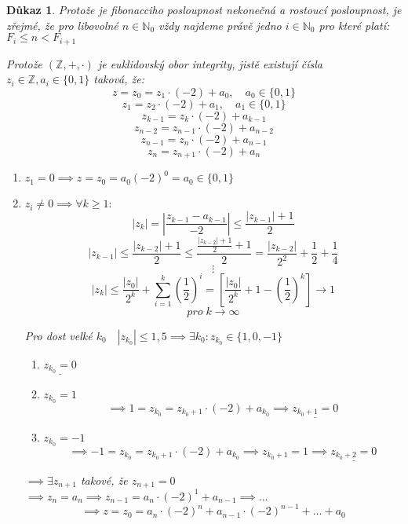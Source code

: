 \documentclass[12pt]{book}
\newtheorem*{dukaz}{Důkaz}
\begin{document}
\begin{dukaz}\label{fiboDF}
	Protože je fibonacciho posloupnost nekonečná a rostoucí posloupnost, je zřejmé, že pro libovolné $n\in\mathbb{N}_0$ vždy najdeme právě jedno $i\in\mathbb{N}_0$ pro které platí: $F_i\le n<F_{i+1}$
	
	Protože $(\mathbb{Z},+,\cdot)$ je euklidovský obor integrity, jistě existují čísla $z_i\in\mathbb{Z}, a_i\in\{0,1\}$ taková, že:
	$$ z=z_0=z_1\cdot(-2)+a_0,\quad a_0\in\{0,1\}$$
	$$ z_1=z_2\cdot(-2)+a_1,\quad a_1\in\{0,1\}$$
	$$ z_{k-1}=z_k\cdot(-2)+a_{k-1}$$
	$$ z_{n-2}=z_{n-1}\cdot(-2)+a_{n-2}$$
	$$ z_{n-1}=z_n\cdot(-2)+a_{n-1}$$
	$$ z_n=z_{n+1}\cdot(-2)+a_n$$
	\begin{enumerate}
		\item[$\alpha)$] $z_1=0 \implies z=z_0=a_0(-2)^0=a_0\in\{0,1\}$
		\item[$\beta)$]  $z_i \ne 0 \implies \forall k \ge 1:$
		$$|z_k|=\left|\frac{z_{k-1}-a_{k-1}}{-2}\right|\le \frac{|z_{k-1}|+1}{2}$$
		$$|z_{k-1}|\le\frac{|z_{k-2}|+1}{2}\le\frac{\frac{|z_{k-2}|+1}{2}+1}{2}=\frac{|z_{k-2}|}{2^2}+\frac{1}{2}+\frac{1}{4}$$
		$$\vdots$$
		$$|z_k|\le\frac{|z_0|}{2^k}+\sum_{i=1}^{k}\left(\frac{1}{2}\right)^i=\left[\frac{|z_0|}{2^k}+1-\left(\frac{1}{2}\right)^k \right]\to 1 $$
		$$ pro\; k \to \infty $$
		
		Pro dost velké $k_0 \quad |z_{k_0}|\le1,5 \implies \exists k_0:z_{k_0}\in\{1,0,-1\}$
		\begin{enumerate}
			\item[a)] $\underline{z_{k_0}=0}$
			\item[b)]$z_{k_0}=1$
			$$\implies 1=z_{k_0}=z_{k_0+1}\cdot(-2)+a_{k_0}\implies \underline{z_{k_0+1}=0}$$
			\item[c)]$z_{k_0}=-1$
			$$\implies -1=z_{k_0}=z_{k_0+1}\cdot(-2)+a_{k_0}\implies z_{k_0+1}=1\implies \underline{z_{k_0+2}=0}$$
		\end{enumerate}
		$\implies \exists z_{n+1}$ takové, že $z_{n+1}=0$\newline
		$\implies z_n = a_n \implies z_{n-1}=a_n\cdot(-2)^1+a_{n-1}\implies \dots$
		$$\implies z=z_0=a_n\cdot(-2)^n+a_{n-1}\cdot(-2)^{n-1}+\dots+a_0$$
	\end{enumerate}
\end{dukaz}
\end{document}
